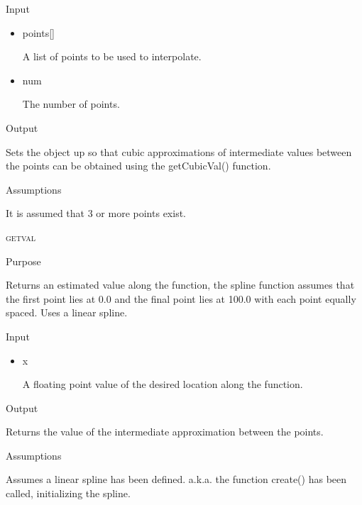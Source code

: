 \documentclass[pdftex, 11pt]{article}
\begin{document}
\begin{description}
\begin{description}
			\item{Input}
			
				\begin{itemize}

					\item{points[]}

						A list of points to be used to interpolate.

					\item{num}

						The number of points.

				\end{itemize}

			\item{Output}

				Sets the object up so that cubic approximations of intermediate values between
				the points can be obtained using the getCubicVal() function.

			\item{Assumptions}

				It is assumed that 3 or more points exist.

		\end{description}


	\item{\textsc{getval}}
		\begin{description}
			\item{Purpose}

				Returns an estimated value along the function, the spline function assumes
				that the first point lies at 0.0 and the final point lies at 100.0 with each
				point equally spaced.  Uses a linear spline.

			\item{Input}

				\begin{itemize}

					\item{x}

						A floating point value of the desired location along the function.

				\end{itemize}

			\item{Output}

				Returns the value of the intermediate approximation between the points.

			\item{Assumptions}

				Assumes a linear spline has been defined. a.k.a. the function create()
				has been called, initializing the spline.


\end{description}
\end{description}
\end{document}
